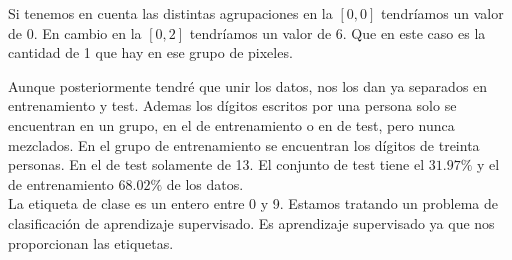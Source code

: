 \documentclass[12pt,a4paper]{article}
\begin{document}
Si tenemos en cuenta las distintas agrupaciones en la $[0,0]$ tendríamos un valor de 0. En cambio en la $[0,2]$ tendríamos un valor de 6. Que en este caso es la cantidad de 1 que hay en ese grupo de pixeles. 

Aunque posteriormente tendré que unir los datos, nos los dan ya separados en entrenamiento y test. Ademas los dígitos escritos por una persona solo se encuentran en un grupo, en el de entrenamiento o en de test, pero nunca mezclados. En el grupo de entrenamiento se encuentran los dígitos de treinta personas. En el de test solamente de 13.  El conjunto de test tiene el $31.97\%$ y el de entrenamiento $68.02\%$ de los datos. \\
La etiqueta de clase es un entero entre 0 y 9. Estamos tratando un problema de clasificación de aprendizaje supervisado. Es aprendizaje supervisado ya que nos proporcionan las etiquetas.
\end{document}
